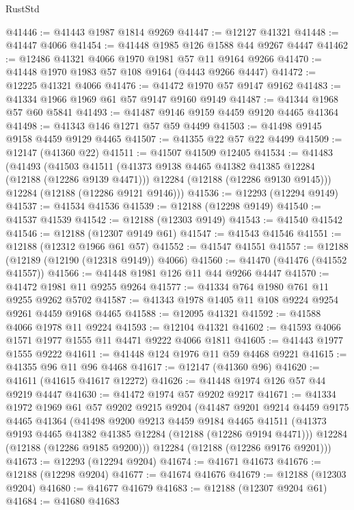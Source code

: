 \begin{lexlean}{RustStd}
\begin{coremodule}
@41446 := @41443 @1987 @1814 @9269
@41447 := @12127 @41321
@41448 := @41447 @4066
@41454 := @41448 @1985 @126 @1588 @44 @9267 @4447
@41462 := @12486 @41321 @4066 @1970 @1981 @57 @11 @9164 @9266
@41470 := @41448 @1970 @1983 @57 @108 @9164 (@4443 @9266 @4447)
@41472 := @12225 @41321 @4066
@41476 := @41472 @1970 @57 @9147 @9162
@41483 := @41334 @1966 @1969 @61 @57 @9147 @9160 @9149
@41487 := @41344 @1968 @57 @60 @5841
@41493 := @41487 @9146 @9159 @4459 @9120 @4465 @41364
@41498 := @41343 @146 @1271 @57 @59 @4499
@41503 := @41498 @9145 @9158 @4459 @9129 @4465
@41507 := @41355 @22 @57 @22 @4499
@41509 := @12147 (@41360 @22)
@41511 := @41507 @41509 @12405
@41534 := @41483
    (@41493
      (@41503
        @41511
        (@41373 @9138 @4465 @41382 @41385 @12284 (@12188 (@12286 @9139 @4471)))
        @12284
        (@12188 (@12286 @9130 @9145)))
      @12284
      (@12188 (@12286 @9121 @9146)))
@41536 := @12293 (@12294 @9149)
@41537 := @41534 @41536
@41539 := @12188 (@12298 @9149)
@41540 := @41537 @41539
@41542 := @12188 (@12303 @9149)
@41543 := @41540 @41542
@41546 := @12188 (@12307 @9149 @61)
@41547 := @41543 @41546
@41551 := @12188 (@12312 @1966 @61 @57)
@41552 := @41547 @41551
@41557 := @12188 (@12189 (@12190 (@12318 @9149)) @4066)
@41560 := @41470 (@41476 (@41552 @41557))
@41566 := @41448 @1981 @126 @11 @44 @9266 @4447
@41570 := @41472 @1981 @11 @9255 @9264
@41577 := @41334 @764 @1980 @761 @11 @9255 @9262 @5702
@41587 := @41343 @1978 @1405 @11 @108 @9224 @9254 @9261 @4459 @9168 @4465
@41588 := @12095 @41321
@41592 := @41588 @4066 @1978 @11 @9224
@41593 := @12104 @41321
@41602 := @41593 @4066 @1571 @1977 @1555 @11 @4471 @9222 @4066 @1811
@41605 := @41443 @1977 @1555 @9222
@41611 := @41448 @124 @1976 @11 @59 @4468 @9221
@41615 := @41355 @96 @11 @96 @4468
@41617 := @12147 (@41360 @96)
@41620 := @41611 (@41615 @41617 @12272)
@41626 := @41448 @1974 @126 @57 @44 @9219 @4447
@41630 := @41472 @1974 @57 @9202 @9217
@41671 := @41334
    @1972
    @1969
    @61
    @57
    @9202
    @9215
    @9204
    (@41487
      @9201
      @9214
      @4459
      @9175
      @4465
      @41364
      (@41498
        @9200
        @9213
        @4459
        @9184
        @4465
        @41511
        (@41373 @9193 @4465 @41382 @41385 @12284 (@12188 (@12286 @9194 @4471)))
        @12284
        (@12188 (@12286 @9185 @9200)))
      @12284
      (@12188 (@12286 @9176 @9201)))
@41673 := @12293 (@12294 @9204)
@41674 := @41671 @41673
@41676 := @12188 (@12298 @9204)
@41677 := @41674 @41676
@41679 := @12188 (@12303 @9204)
@41680 := @41677 @41679
@41683 := @12188 (@12307 @9204 @61)
@41684 := @41680 @41683

\end{coremodule}
\end{lexlean}
